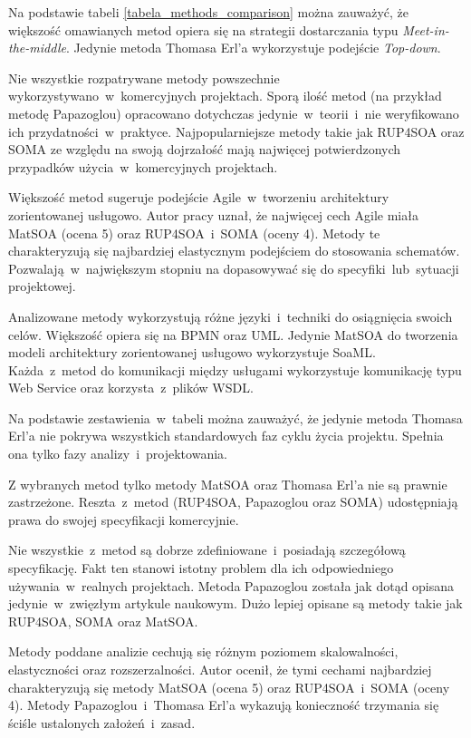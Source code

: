 Na podstawie tabeli \ref{tabela_methods_comparison} można zauważyć, że większość omawianych metod opiera się na strategii dostarczania typu \emph{Meet-in-the-middle}. Jedynie metoda Thomasa Erl'a wykorzystuje podejście \emph{Top-down}.

Nie wszystkie rozpatrywane metody powszechnie wykorzystywano~w~komercyjnych projektach. Sporą ilość metod (na przykład metodę Papazoglou) opracowano dotychczas jedynie~w~teorii~i~nie weryfikowano ich przydatności~w~praktyce. Najpopularniejsze metody takie jak RUP4SOA oraz SOMA ze względu na swoją dojrzałość mają najwięcej potwierdzonych przypadków użycia~w~komercyjnych projektach.

Większość metod sugeruje podejście Agile~w~tworzeniu architektury zorientowanej usługowo. Autor pracy uznał, że najwięcej cech Agile miała MatSOA (ocena 5) oraz RUP4SOA~i~SOMA (oceny 4). Metody te charakteryzują się najbardziej elastycznym podejściem do stosowania schematów. Pozwalają~w~największym stopniu na dopasowywać się do specyfiki~lub~sytuacji projektowej.

Analizowane metody wykorzystują różne języki~i~techniki do osiągnięcia swoich celów. Większość opiera się na BPMN oraz UML. Jedynie MatSOA do tworzenia modeli architektury zorientowanej usługowo wykorzystuje SoaML. Każda~z~metod do komunikacji między usługami wykorzystuje komunikację typu Web Service oraz korzysta~z~plików WSDL.

Na podstawie zestawienia~w~tabeli można zauważyć, że jedynie metoda Thomasa Erl'a nie pokrywa wszystkich standardowych faz cyklu życia projektu. Spełnia ona tylko fazy analizy~i~projektowania.

Z wybranych metod tylko metody MatSOA oraz Thomasa Erl'a nie są prawnie zastrzeżone. Reszta~z~metod (RUP4SOA, Papazoglou oraz SOMA) udostępniają prawa do swojej specyfikacji komercyjnie. 

Nie wszystkie~z~metod są dobrze zdefiniowane~i~posiadają szczegółową specyfikację. Fakt ten stanowi istotny problem dla ich odpowiedniego używania~w~realnych projektach. Metoda Papazoglou została jak dotąd opisana jedynie~w~zwięzłym artykule naukowym. Dużo lepiej opisane są metody takie jak RUP4SOA, SOMA oraz MatSOA. 

Metody poddane analizie cechują się różnym poziomem skalowalności, elastyczności oraz rozszerzalności. Autor ocenił, że tymi cechami najbardziej charakteryzują się metody MatSOA (ocena 5) oraz RUP4SOA~i~SOMA (oceny 4). Metody Papazoglou~i~Thomasa Erl'a wykazują konieczność trzymania się ściśle ustalonych założeń~i~zasad.

